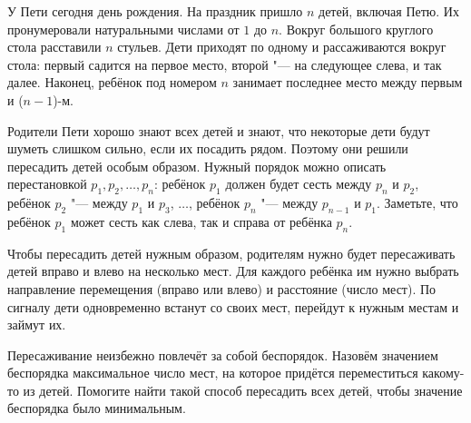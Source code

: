 
У Пети сегодня день рождения. На праздник пришло $n$ детей, включая Петю.
Их пронумеровали натуральными числами от $1$ до $n$. Вокруг большого круглого
стола расставили $n$ стульев. Дети приходят по одному и рассаживаются вокруг
стола: первый садится на первое место, второй "--- на следующее слева, и так
далее. Наконец, ребёнок под номером $n$ занимает последнее место между
первым и ($n - 1$)-м.

Родители Пети хорошо знают всех детей и знают, что некоторые дети будут
шуметь слишком сильно, если их посадить рядом. Поэтому они решили пересадить
детей особым образом. Нужный порядок можно описать перестановкой
$p_1, p_2, \ldots, p_n$: ребёнок $p_1$ должен будет сесть между $p_n$ и
$p_2$, ребёнок $p_2$ "--- между $p_1$ и $p_3$, $\ldots$,
ребёнок $p_n$ "--- между $p_{n - 1}$ и $p_1$. Заметьте, что ребёнок
$p_1$ может сесть как слева, так и справа от ребёнка $p_n$.

Чтобы пересадить детей нужным образом, родителям нужно будет пересаживать
детей вправо и влево на несколько мест. Для каждого ребёнка им нужно выбрать
направление перемещения (вправо или влево) и расстояние (число мест).
По сигналу дети одновременно встанут со своих мест, перейдут к нужным местам
и займут их.

Пересаживание неизбежно повлечёт за собой беспорядок. Назовём значением
беспорядка максимальное число мест, на которое придётся переместиться
какому-то из детей. Помогите найти такой способ пересадить всех детей, чтобы
значение беспорядка было минимальным.


